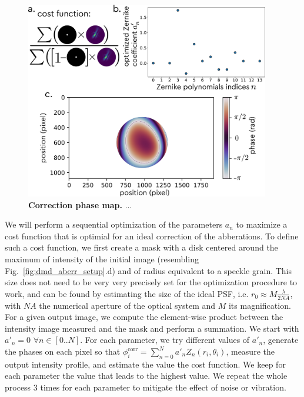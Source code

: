 \documentclass[12pt]{iopart}
\begin{document}
\begin{figure}
  \centering
  \includegraphics[width = 0.95\textwidth]{images/Zernike_1.pdf}
  \caption{
  \textbf{Correction phase map.}
 ...
  }
  \label{fig:phase_corr}
\end{figure}

We will perform a sequential optimization of the parameters $a_n$ 
to maximize a cost function that is optimial for an ideal correction of the abberations.
To define such a cost function, we first create a mask with a disk 
centered around the maximum of intensity of the initial image (resembling Fig.~\ref{fig:dmd_aberr_setup}.d)
and of radius equivalent to a speckle grain. 
This size does not need to be very very precisely set for the optimization procedure to work, 
and can be found by estimating the size of the ideal PSF, i.e. $r_0 \approx M \frac{\lambda}{2 NA}$, 
with $NA$ the numerical aperture of the optical system and $M$ its magnification.
For a given output image,  we compute the element-wise product between the intensity image measured and the mask and perform a summation.
We start with $a'_n = 0\,\, \forall n \in [0..N]$.
For each parameter, we try different values of $a'_n$,
generate the phases on each pixel so that 
$\phi_i^\text{corr} = \sum_{n=0}^N a'_n Z_n(r_i,\theta_i)$, 
measure the output intensity profile,
and estimate the value the cost function.
We keep for each parameter the value that leads to the highest value.
We repeat the whole process $3$ times for each parameter to 
mitigate the effect of noise or vibration.
\end{document}
